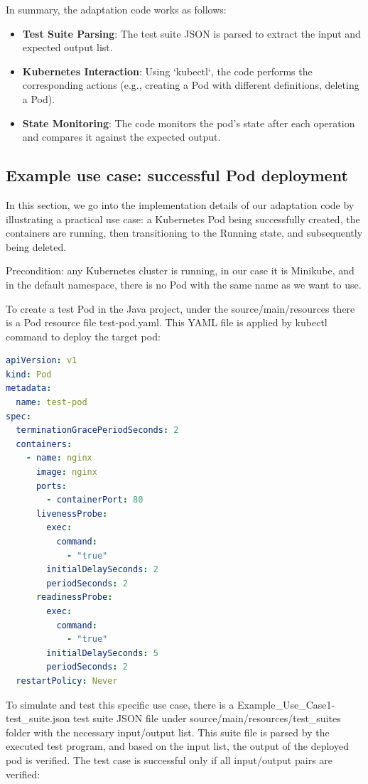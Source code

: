 \documentclass[main.tex]{subfiles}
\begin{document}
In summary, the adaptation code works as follows:
\begin{itemize}
    \item \textbf{Test Suite Parsing}: The test suite JSON is parsed to extract the input and expected output list.
    \item \textbf{Kubernetes Interaction}: Using `kubectl`, the code performs the corresponding actions (e.g., creating a Pod with different definitions, deleting a Pod).
    \item \textbf{State Monitoring}: The code monitors the pod's state after each operation and compares it against the expected output.
\end{itemize}

\subsection{Example use case: successful Pod deployment}
In this section, we go into the implementation details of our adaptation code by illustrating a practical use case: a Kubernetes Pod being successfully created, the containers are running, then transitioning to the Running state, and subsequently being deleted. 

Precondition: any Kubernetes cluster is running, in our case it is Minikube, and in the default namespace, there is no Pod with the same name as we want to use.

To create a test Pod in the Java project, under the source/main/resources there is a Pod resource file test-pod.yaml. This YAML file is applied by kubectl command to deploy the target pod:

\begin{lstlisting}[language=yaml]
apiVersion: v1
kind: Pod
metadata:
  name: test-pod
spec:
  terminationGracePeriodSeconds: 2
  containers:
    - name: nginx
      image: nginx
      ports:
        - containerPort: 80
      livenessProbe:
        exec:
          command:
            - "true"
        initialDelaySeconds: 2
        periodSeconds: 2
      readinessProbe:
        exec:
          command:
            - "true"
        initialDelaySeconds: 5
        periodSeconds: 2
  restartPolicy: Never
\end{lstlisting}

To simulate and test this specific use case, there is a Example\_Use\_Case1-test\_suite.json test suite JSON file under source/main/resources/test\_suites folder with the necessary input/output list. This suite file is parsed by the executed test program, and based on the input list, the output of the deployed pod is verified. The test case is successful only if all input/output pairs are verified:
\end{document}
